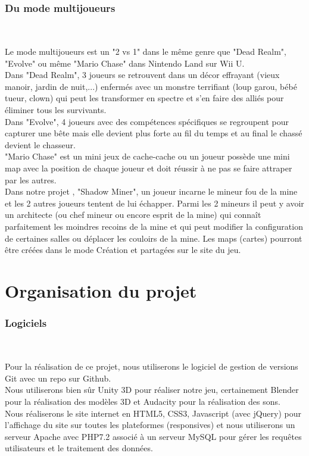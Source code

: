 \documentclass[titlepage, 13px, a4paper]{article}
\begin{document}
\newpage
\section{Du mode multijoueurs}
\paragraph{} \hspace{0pt} \\
Le mode multijoueurs est un "2 vs 1" dans le même genre que "Dead Realm", "Evolve" 
ou même "Mario Chase" dans Nintendo Land sur Wii U. 
\\
Dans "Dead Realm", 3 joueurs se retrouvent dans un décor effrayant (vieux manoir, jardin de nuit,...) enfermés 
avec un monstre terrifiant (loup garou, bébé tueur, clown) qui peut les transformer 
en spectre et s'en faire des alliés pour éliminer tous les survivants. 
\\
Dans "Evolve", 4 joueurs avec des compétences spécifiques se regroupent pour capturer 
une bête mais elle devient plus forte au fil du temps et au final le chassé devient le chasseur. 
\\
"Mario Chase" est un mini jeux de cache-cache ou un joueur possède une mini map 
avec la position de chaque joueur et doit réussir à ne pas se faire attraper par les autres. 
\\
Dans notre projet , "Shadow Miner", un joueur incarne le mineur fou de la mine et les 2 autres 
joueurs tentent de lui échapper. Parmi les 2 mineurs il peut y avoir un architecte (ou chef mineur ou encore esprit de la mine) 
qui connaît parfaitement les moindres recoins de la mine et qui peut modifier la configuration 
de certaines salles ou déplacer les couloirs de la mine. Les maps (cartes) pourront être créées 
dans le mode Création et partagées sur le site du jeu. 

\newpage
\part{Organisation du projet}
\section{Logiciels}
\paragraph{} \hspace{0pt} \\
Pour la réalisation de ce projet, nous utiliserons le logiciel de gestion de versions Git 
avec un repo sur Github.
\\
Nous utiliserons bien sûr Unity 3D pour réaliser notre jeu, certainement Blender 
pour la réalisation des modèles 3D et Audacity pour la réalisation des sons.
\\
Nous réaliserons le site internet en HTML5, CSS3, Javascript (avec jQuery) pour l’affichage du site sur toutes les plateformes (responsives) 
et nous utiliserons un serveur Apache avec PHP7.2 associé à un serveur MySQL pour gérer les requêtes utilisateurs et le traitement des données.
\end{document}
